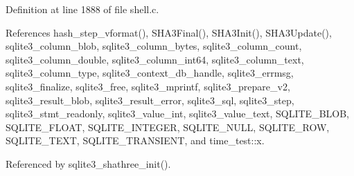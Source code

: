 Definition at line 1888 of file shell.\+c.



References hash\+\_\+step\+\_\+vformat(), S\+H\+A3\+Final(), S\+H\+A3\+Init(), S\+H\+A3\+Update(), sqlite3\+\_\+column\+\_\+blob, sqlite3\+\_\+column\+\_\+bytes, sqlite3\+\_\+column\+\_\+count, sqlite3\+\_\+column\+\_\+double, sqlite3\+\_\+column\+\_\+int64, sqlite3\+\_\+column\+\_\+text, sqlite3\+\_\+column\+\_\+type, sqlite3\+\_\+context\+\_\+db\+\_\+handle, sqlite3\+\_\+errmsg, sqlite3\+\_\+finalize, sqlite3\+\_\+free, sqlite3\+\_\+mprintf, sqlite3\+\_\+prepare\+\_\+v2, sqlite3\+\_\+result\+\_\+blob, sqlite3\+\_\+result\+\_\+error, sqlite3\+\_\+sql, sqlite3\+\_\+step, sqlite3\+\_\+stmt\+\_\+readonly, sqlite3\+\_\+value\+\_\+int, sqlite3\+\_\+value\+\_\+text, S\+Q\+L\+I\+T\+E\+\_\+\+B\+L\+OB, S\+Q\+L\+I\+T\+E\+\_\+\+F\+L\+O\+AT, S\+Q\+L\+I\+T\+E\+\_\+\+I\+N\+T\+E\+G\+ER, S\+Q\+L\+I\+T\+E\+\_\+\+N\+U\+LL, S\+Q\+L\+I\+T\+E\+\_\+\+R\+OW, S\+Q\+L\+I\+T\+E\+\_\+\+T\+E\+XT, S\+Q\+L\+I\+T\+E\+\_\+\+T\+R\+A\+N\+S\+I\+E\+NT, and time\+\_\+test\+::x.



Referenced by sqlite3\+\_\+shathree\+\_\+init().


